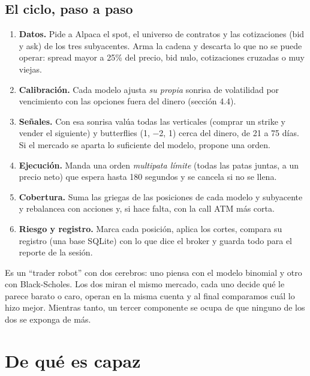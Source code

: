 \documentclass[11pt,a4paper]{article}
\begin{document}
\subsection{El ciclo, paso a paso}

\begin{enumerate}[label=\textbf{\arabic*.}]
\item \textbf{Datos.} Pide a Alpaca el spot, el universo de contratos y las cotizaciones (bid y ask) de los tres
  subyacentes. Arma la cadena y descarta lo que no se puede operar: spread mayor a 25\% del precio, bid nulo,
  cotizaciones cruzadas o muy viejas.
\item \textbf{Calibración.} Cada modelo ajusta \emph{su propia} sonrisa de volatilidad por vencimiento con las
  opciones fuera del dinero (sección 4.4).
\item \textbf{Señales.} Con esa sonrisa valúa todas las verticales (comprar un strike y vender el siguiente) y
  butterflies (1, −2, 1) cerca del dinero, de 21 a 75 días. Si el mercado se aparta lo suficiente del modelo,
  propone una orden.
\item \textbf{Ejecución.} Manda una orden \emph{multipata límite} (todas las patas juntas, a un precio neto) que
  espera hasta 180 segundos y se cancela si no se llena.
\item \textbf{Cobertura.} Suma las griegas de las posiciones de cada modelo y subyacente y rebalancea con acciones
  y, si hace falta, con la call ATM más corta.
\item \textbf{Riesgo y registro.} Marca cada posición, aplica los cortes, compara su registro (una base SQLite) con
  lo que dice el broker y guarda todo para el reporte de la sesión.
\end{enumerate}

\begin{criollo}
Es un ``trader robot'' con dos cerebros: uno piensa con el modelo binomial y otro con Black-Scholes. Los dos miran el
mismo mercado, cada uno decide qué le parece barato o caro, operan en la misma cuenta y al final comparamos cuál
lo hizo mejor. Mientras tanto, un tercer componente se ocupa de que ninguno de los dos se exponga de más.
\end{criollo}

\newpage
\section{De qué es capaz}
\end{document}
